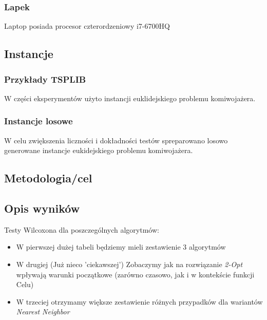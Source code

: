 \documentclass{article}
\begin{document}
\subsubsection{Lapek}
Laptop posiada procesor czterordzeniowy i7-6700HQ

\subsection{Instancje}
\subsubsection{Przykłady TSPLIB}
W części eksperymentów użyto instancji euklidejskiego problemu komiwojażera.

\subsubsection{Instancje losowe}
W celu zwiększenia liczności i dokładności testów spreparowano losowo generowane instancje eukidejskiego problemu komiwojażera.

\subsection{Metodologia/cel}

\subsection{Opis wyników}
Testy Wilcoxona dla poszczególnych algorytmów:
\begin{itemize}
	\item W pierwszej dużej tabeli będziemy mieli zestawienie 3 algorytmów
	\item W drugiej (Już nieco 'ciekawszej') Zobaczymy jak na rozwiązanie \textit{2-Opt} wpływają warunki początkowe (zarówno czasowo, jak i w kontekście funkcji Celu)
	\item W trzeciej otrzymamy większe zestawienie różnych przypadków dla wariantów \textit{Nearest Neighbor}
\end{itemize}

\newpage
\end{document}
